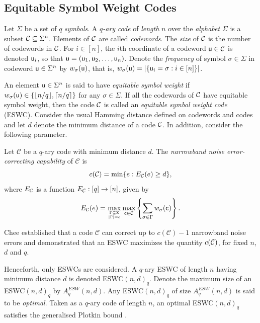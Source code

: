 \documentclass[draft, 11pt]{article}
\begin{document}
 \subsection{Equitable Symbol Weight Codes}
\label{prelim}


Let $\Sigma$ be a set of $q$ {\em symbols}. A {\em $q$-ary} {\em
code} of {\em length} $n$ over the {\em alphabet} $\Sigma$ is a
subset $\mathcal C\subseteq\Sigma^n$. Elements of $\mathcal C$ are called {\em
codewords}. The {\em size} of $\mathcal C$ is the number of codewords in
$\mathcal C$. For $i\in[n]$, the $i$th coordinate of a codeword ${\sf u}\in\mathcal C$
is denoted ${\sf u}_i$, so that ${\sf u}=({\sf u}_1,{\sf u}_2,\ldots,{\sf u}_n)$.
Denote the {\em frequency} of symbol $\sigma\in \Sigma$ in codeword
${\sf u}\in\Sigma^n$ by $w_\sigma({\sf u})$, that is, $w_\sigma({\sf u}) = |
\{{\sf u}_i=\sigma : i\in[n]\}|$.

An element ${\sf u}\in\Sigma^n$ is said to have \emph{equitable symbol
weight}  if $w_\sigma({\sf u})\in \{\lfloor n/q\rfloor,\lceil
n/q\rceil\}$ for any $\sigma\in \Sigma$. If all the codewords of
$\mathcal C$ have equitable symbol weight, then the code $\mathcal C$ is called an
\emph{equitable symbol weight code} (ESWC).
Consider the usual Hamming distance defined on codewords and codes
and let $d$ denote the minimum distance of a code $\mathcal C$.
In addition, consider the following parameter.


\begin{definition}
Let $\mathcal C$ be a $q$-ary code with minimum distance $d$. The
{\em narrowband noise error-correcting capability}
of $\mathcal C$ is
\begin{equation*}
c({\mathcal C})=\min\{e: E_\mathcal C(e)\ge d\},
\end{equation*}
where $E_\mathcal C$ is a function $E_\mathcal C:[q]\to[n]$, given by
\begin{equation*}
E_{\mathcal C}(e)=\max_{\Gamma\subseteq\Sigma \atop |\Gamma|=e}
\max_{{\sf c} \in\mathcal C} \left\{\sum_{\sigma \in
\Gamma}w_\sigma({\sf c})\right\}.
\end{equation*}
\end{definition}


Chee \etal{} \cite{Cheeetal:2013tc} established that a code
$\mathcal C$ can correct up to $c({\mathcal C})-1$ narrowband noise
errors and demonstrated that an ESWC
maximizes the quantity $c(\mathcal C)$, for fixed $n$, $d$ and $q$.

Henceforth, only ESWCs are considered. A
$q$-ary ESWC of length $n$ having minimum
distance $d$ is denoted ESWC$(n,d)_q$. %
Denote the maximum size of an ESWC$(n,d)_q$ by $A^{ESW}_q(n,d)$. 
Any ESWC$(n,d)_q$ of size $A^{ESW}_q(n,d)$ is said to be {\em optimal}.
Taken as a $q$-ary code of length $n$, an optimal
ESWC$(n,d)_q$ satisfies the generalised Plotkin bound
\cite{Bogdanovaetal:2001}.
\end{document}
